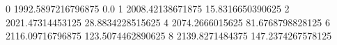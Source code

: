 0 1992.5897216796875 0.0
1 2008.42138671875 15.8316650390625
2 2021.47314453125 28.8834228515625
4 2074.2666015625 81.6768798828125
6 2116.09716796875 123.5074462890625
8 2139.8271484375 147.2374267578125
